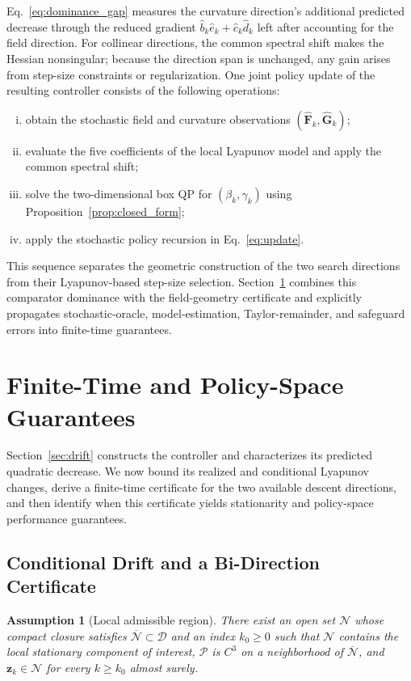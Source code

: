 \documentclass[journal]{IEEEtran}
\newtheorem{assumption}{Assumption}
\theoremstyle{remark}
\newcommand{\cD}{\mathcal{D}}
\newcommand{\cN}{\mathcal{N}}
\newcommand{\bz}{\boldsymbol{z}}
\newcommand{\hatF}{\widehat{\boldsymbol{F}}}
\newcommand{\hatG}{\widehat{\boldsymbol{G}}}
\newcommand{\cP}{\mathcal{P}}
\begin{document}
	Eq.~\eqref{eq:dominance_gap} measures the curvature direction's additional predicted decrease through the reduced gradient $\hat b_k\hat e_k+\hat c_k\hat d_k$ left after accounting for the field direction.
	For collinear directions, the common spectral shift makes the Hessian nonsingular; because the direction span is unchanged, any gain arises from step-size constraints or regularization.
	One joint policy update of the resulting controller consists of the following operations:
	\begin{enumerate}[(i)]
		\item obtain the stochastic field and curvature observations $(\hatF_k,\hatG_k)$;
		\item evaluate the five coefficients of the local Lyapunov model and apply the common spectral shift;
		\item solve the two-dimensional box QP for $(\beta_k,\gamma_k)$ using Proposition~\ref{prop:closed_form};
		\item apply the stochastic policy recursion in Eq.~\eqref{eq:update}.
	\end{enumerate}
	This sequence separates the geometric construction of the two search directions from their Lyapunov-based step-size selection.
	Section~\ref{sec:conv} combines this comparator dominance with the field-geometry certificate and explicitly propagates stochastic-oracle, model-estimation, Taylor-remainder, and safeguard errors into finite-time guarantees.
	
	\section{Finite-Time and Policy-Space Guarantees}\label{sec:conv}
	Section~\ref{sec:drift} constructs the controller and characterizes its predicted quadratic decrease.
	We now bound its realized and conditional Lyapunov changes, derive a finite-time certificate for the two available descent directions, and then identify when this certificate yields stationarity and policy-space performance guarantees.
	
	\subsection{Conditional Drift and a Bi-Direction Certificate}\label{subsec:pathwise}
	
	\begin{assumption}[Local admissible region]\label{ass:local}
		There exist an open set $\cN$ whose compact closure satisfies $\overline{\cN}\subset\cD$ and an index $k_{0}\ge0$ such that $\cN$ contains the local stationary component of interest, $\cP$ is $C^3$ on a neighborhood of $\overline{\cN}$, and $\bz_k\in\cN$ for every $k\ge k_0$ almost surely.
	\end{assumption}
	
\end{document}
